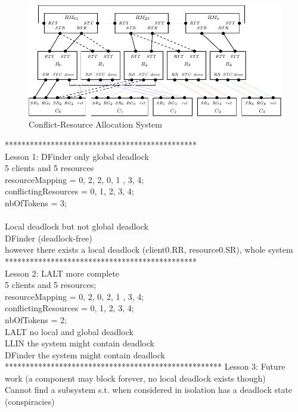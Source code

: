 \begin{figure}[ht]
\begin{center}
\includegraphics[scale=1.2]{compiledfigures/resourceallocation-crop.pdf}
\caption{Conflict-Resource Allocation System}
\label{fig:resourceallocation}
\end{center}
\end{figure}


**********************************************\\
Lesson 1: DFinder only global deadlock \\
5 clients and 5 resources \\
resourceMapping = {{0, 2}, {2, 0}, {1} , {3}, {4}};\\
conflictingResources = {{0, 1}, {2, 3}, {4}};\\
nbOfTokens = 3;\\\\


Local deadlock but not global deadlock \\
DFinder (deadlock-free)\\
however there exists a local deadlock (client0.RR, resource0.SR), whole system \\
**********************************************\\
Lesson 2: LALT more complete \\
5 clients and 5 resources; \\
resourceMapping = {{0, 2}, {0, 2}, {1} , {3}, {4}};\\
conflictingResources = {{0, 1}, {2, 3, 4}};\\
nbOfTokens = 2;\\

LALT no local and global deadlock \\
LLIN the system might contain deadlock \\
DFinder the system might contain deadlock\\
****************************************************
Lesson 3: Future work (a component may block forever, no local deadlock exists though)\\
Cannot find a subsystem s.t. when considered in isolation has a deadlock state (conspiracies)\\

